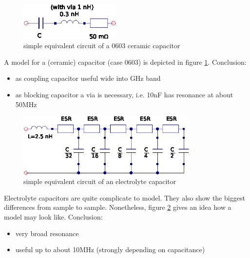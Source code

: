 \addvspace{12pt}

\begin{figure}[ht]
\begin{center}
\includegraphics[width=5cm]{Real_c}
\end{center}
\caption{simple equivalent circuit of a 0603 ceramic capacitor}
\label{fig:real_c}
\end{figure}
\FloatBarrier

A model for a (ceramic) capacitor (case 0603) is depicted in figure
\ref{fig:real_c}. Conclusion:
\begin{itemize}
\item as coupling capacitor useful wide into GHz band
\item as blocking capacitor a via is necessary, i.e. 10nF has resonance
      at about 50MHz
\end{itemize}

\addvspace{12pt}

\begin{figure}[ht]
\begin{center}
\includegraphics[width=9cm]{Real_ec}
\end{center}
\caption{simple equivalent circuit of an electrolyte capacitor}
\label{fig:real_ec}
\end{figure}
\FloatBarrier

Electrolyte capacitors are quite complicate to model. They also show the
biggest differences from sample to sample. Nonetheless, figure
\ref{fig:real_ec} gives an idea how a model may look like. Conclusion:
\begin{itemize}
\item very broad resonance
\item useful up to about 10MHz (strongly depending on capacitance)
\end{itemize}
